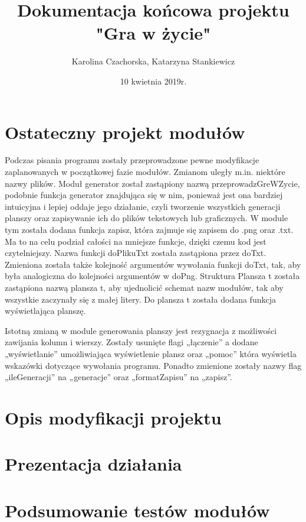 \documentclass[10pt, oneside]{article}
\title{Dokumentacja końcowa projektu "Gra w życie"}
\author{Karolina Czachorska, Katarzyna Stankiewicz}
\date{10 kwietnia 2019r.}
\begin{document}
\maketitle	%
\tableofcontents	%
\newpage	 %
\section{Ostateczny projekt modułów}
Podczas pisania programu zostały przeprowadzone pewne modyfikacje zaplanowanych w początkowej fazie modułów.
Zmianom uległy m.in. niektóre nazwy plików. 
Moduł generator został zastąpiony nazwą przeprowadzGreWZycie, podobnie funkcja generator znajdująca się w nim, ponieważ jest ona bardziej intuicyjna i lepiej oddaje jego działanie, czyli tworzenie wszystkich generacji planszy oraz zapisywanie ich do plików tekstowych lub graficznych. W module tym została dodana funkcja zapisz, która zajmuje się zapisem do .png oraz .txt. Ma to na celu podział całości na mniejsze funkcje, dzięki czemu kod jest czytelniejszy. Nazwa funkcji doPlikuTxt została zastąpiona przez doTxt. Zmieniona została także kolejność argumentów wywołania funkcji doTxt, tak, aby była analogiczna do kolejności argumentów w doPng. Struktura Plansza t została zastąpiona nazwą plansza t, aby ujednolicić schemat nazw modułów, tak aby wszystkie zaczynały się z małej litery. Do plansza t została dodana funkcja wyświetlająca planszę. 
	 
Istotną zmianą w module generowania planszy jest rezygnacja z możliwości zawijania kolumn i wierszy. 
Zostały usunięte flagi „łączenie” a dodane „wyświetlanie” umożliwiająca wyświetlenie plansz oraz „pomoc” która wyświetla wskazówki dotyczące wywołania programu. Ponadto zmienione zostały nazwy flag „ileGeneracji” na „generacje” oraz „formatZapisu” na „zapisz”.

\section{Opis modyfikacji projektu}

\section{Prezentacja działania}

\section{Podsumowanie testów modułów}
\end{document}
